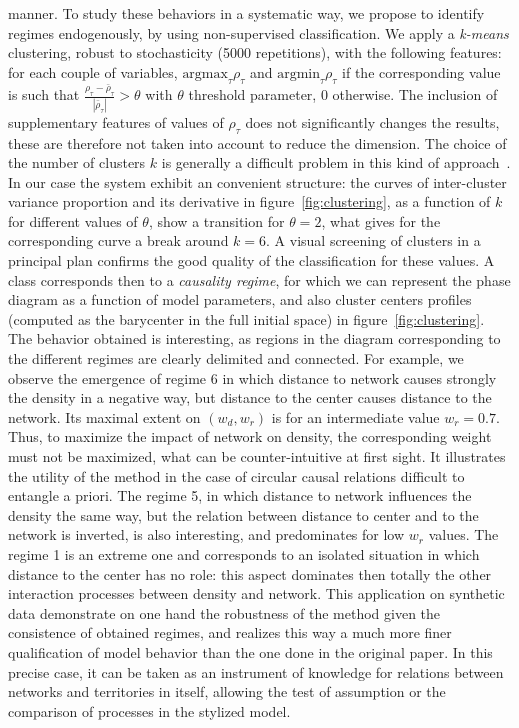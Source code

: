 {manner. To study these behaviors in a systematic way, we propose to identify regimes endogenously, by using non-supervised classification. We apply a \emph{k-means} clustering, robust to stochasticity (5000 repetitions), with the following features: for each couple of variables, $\textrm{argmax}_{\tau} \rho_{\tau}$ and $\textrm{argmin}_{\tau} \rho_{\tau}$ if the corresponding value is such that $\frac{\rho_{\tau}-\bar{\rho}_{\tau}}{\left|\bar{\rho}_{\tau}\right|} > \theta$ with $\theta$ threshold parameter, 0 otherwise. The inclusion of supplementary features of values of $\rho_{\tau}$ does not significantly changes the results, these are therefore not taken into account to reduce the dimension. The choice of the number of clusters $k$ is generally a difficult problem in this kind of approach~\cite{hamerly2003learning}. In our case the system exhibit an convenient structure: the curves of inter-cluster variance proportion and its derivative in figure~\ref{fig:clustering}, as a function of $k$ for different values of $\theta$, show a transition for $\theta = 2$, what gives for the corresponding curve a break around $k=6$. A visual screening of clusters in a principal plan confirms the good quality of the classification for these values. A class corresponds then to a \emph{causality regime}, for which we can represent the phase diagram as a function of model parameters, and also cluster centers profiles (computed as the barycenter in the full initial space) in figure~\ref{fig:clustering}. The behavior obtained is interesting, as regions in the diagram corresponding to the different regimes are clearly delimited and connected. For example, we observe the emergence of regime 6 in which distance to network causes strongly the density in a negative way, but distance to the center causes distance to the network. Its maximal extent on $(w_d,w_r)$ is for an intermediate value $w_r=0.7$. Thus, to maximize the impact of network on density, the corresponding weight must not be maximized, what can be counter-intuitive at first sight. It illustrates the utility of the method in the case of circular causal relations difficult to entangle a priori. The regime 5, in which distance to network influences the density the same way, but the relation between distance to center and to the network is inverted, is also interesting, and predominates for low $w_r$ values. The regime 1 is an extreme one and corresponds to an isolated situation in which distance to the center has no role: this aspect dominates then totally the other interaction processes between density and network. This application on synthetic data demonstrate on one hand the robustness of the method given the consistence of obtained regimes, and realizes this way a much more finer qualification of model behavior than the one done in the original paper. In this precise case, it can be taken as an instrument of knowledge for relations between networks and territories in itself, allowing the test of assumption or the comparison of processes in the stylized model.
}

